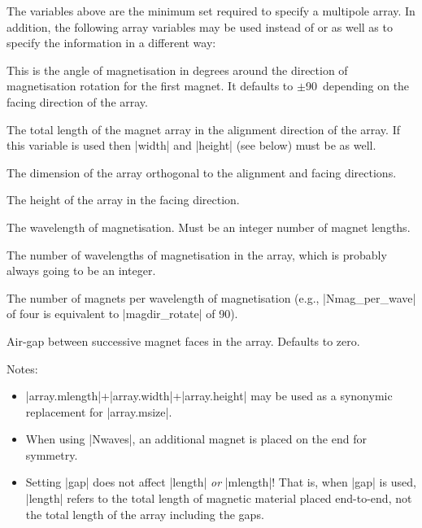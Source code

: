 \documentclass{article}
\begin{document}
The variables above are the minimum set required to specify a multipole array.
In addition, the following array variables may be used instead of or as well as to specify the information in a different way:
\begin{description}[noitemsep,font=\ttfamily]
\item[array.magdir_first] This is the angle of magnetisation in degrees around the direction of magnetisation rotation for the first magnet. It defaults to $\pm$90\textdegree\ depending on the facing direction of the array.
\item[array.length] The total length of the magnet array in the alignment direction of the array. If this variable is used then |width| and |height| (see below) must be as well.
\item[array.width] The dimension of the array orthogonal to the alignment and facing directions.
\item[array.height] The height of the array in the facing direction.
\item[array.wavelength] The wavelength of magnetisation. Must be an integer number of magnet lengths.
\item[array.Nwaves] The number of wavelengths of magnetisation in the array, which is probably always going to be an integer.
\item[array.Nmag_per_wave] The number of magnets per wavelength of magnetisation (e.g., |Nmag_per_wave| of four is equivalent to |magdir_rotate| of 90\textdegree).
\item[array.gap] Air-gap between successive magnet faces in the array. Defaults to zero.
\end{description}
Notes:
\begin{itemize}
\item |array.mlength|+|array.width|+|array.height| may be used as a synonymic replacement for |array.msize|.
\item When using |Nwaves|, an additional magnet is placed on the end for symmetry.
\item Setting |gap| does not affect |length| \emph{or} |mlength|! That is,
when |gap| is used, |length| refers to the total length of magnetic material placed end-to-end, not the total length of the array including the gaps.
\end{itemize}
\end{document}
